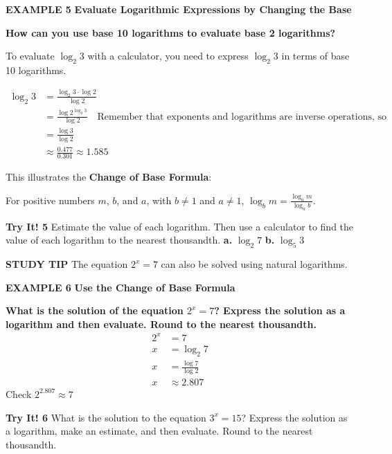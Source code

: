 \documentclass{article}
\newenvironment{example}[1]{\textbf{EXAMPLE #1}}{}
\newenvironment{tryit}[1]{\textbf{Try It! #1}}{}
\newcommand{\answer}[1]{}
\begin{document}
\begin{example}{5}
\textbf{Evaluate Logarithmic Expressions by Changing the Base}

\textbf{How can you use base 10 logarithms to evaluate base 2 logarithms?}

To evaluate $\log_2 3$ with a calculator, you need to express $\log_2 3$ in terms of base 10 logarithms.

\begin{align*}
\log_2 3 &= \frac{\log_2 3 \cdot \log 2}{\log 2} \\
&= \frac{\log 2^{\log_2 3}}{\log 2} \quad \text{Remember that exponents and logarithms are inverse operations, so they undo one another.} \\
&= \frac{\log 3}{\log 2} \\
&\approx \frac{0.477}{0.301} \approx 1.585
\end{align*}

This illustrates the \textbf{Change of Base Formula}:

For positive numbers $m$, $b$, and $a$, with $b \neq 1$ and $a \neq 1$, $\log_b m = \frac{\log_a m}{\log_a b}$.
\end{example}

\begin{tryit}{5}
Estimate the value of each logarithm. Then use a calculator to find the value of each logarithm to the nearest thousandth.
\textbf{a.} $\log_2 7$ \quad
\textbf{b.} $\log_5 3$
\answer{a. $\approx 2.807$ \quad b. $\approx 0.683$}
\end{tryit}

\vspace{1em}
\textbf{STUDY TIP}
The equation $2^x = 7$ can also be solved using natural logarithms.

\begin{example}{6}
\textbf{Use the Change of Base Formula}

\textbf{What is the solution of the equation $2^x = 7$? Express the solution as a logarithm and then evaluate. Round to the nearest thousandth.}
\begin{align*}
2^x &= 7 \\
x &= \log_2 7 \\
x &= \frac{\log 7}{\log 2} \\
x &\approx 2.807
\end{align*}
Check $2^{2.807} \approx 7$
\end{example}

\begin{tryit}{6}
What is the solution to the equation $3^x = 15$? Express the solution as a logarithm, make an estimate, and then evaluate. Round to the nearest thousandth.
\answer{$x = \log_3 15 \approx 2.465$}
\end{tryit}
\end{document}
